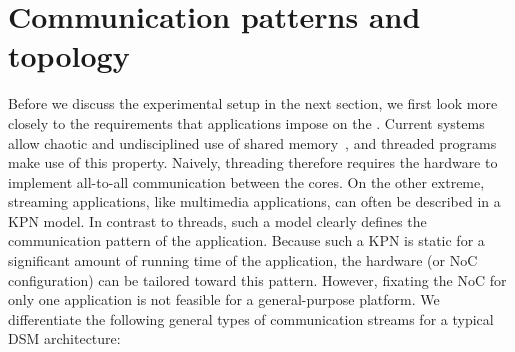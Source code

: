 \section{Communication patterns and topology}
\label{s:hardware:topology}

Before we discuss the experimental setup in the next section, we first look more closely to the requirements that applications impose on the .
Current systems allow chaotic and undisciplined use of shared memory~\cite{adve:rethinking}, and threaded programs make use of this property.
Naively, threading therefore requires the hardware to implement all-to-all communication between the cores.
On the other extreme, streaming applications, like multimedia applications, can often be described in a \ac{KPN} model.
In contrast to threads, such a model clearly defines the communication pattern of the application.
Because such a \ac{KPN} is static for a significant amount of running time of the application, the hardware (or \ac{NoC} configuration) can be tailored toward this pattern.
However, fixating the \ac{NoC}  for only one application is not feasible for a general-purpose platform.
We differentiate the following general types of communication streams for a typical \ac{DSM} architecture:
